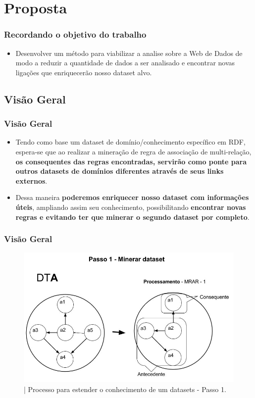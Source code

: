 \documentclass[hyperref={pdfpagelabels=false}]{beamer}
\begin{document}
    
\section{Proposta}

\begin{frame}
\frametitle{Recordando o objetivo do trabalho}
\begin{itemize}
 \item Desenvolver um método para viabilizar a analise sobre a Web de Dados de modo a reduzir a quantidade de dados a ser analisado e encontrar novas ligações que enriquecerão nosso dataset alvo. 
\end{itemize}		
\end{frame}


    

  \subsection{Visão Geral}  
	\begin{frame}
    \frametitle{Visão Geral}
   \begin{itemize}
      	\item Tendo como base um dataset de domínio/conhecimento específico em RDF, espera-se que ao realizar a mineração de regra de associação de multi-relação, \textbf{os consequentes das regras encontradas, servirão como ponte para outros datasets de domínios diferentes através de seus links externos}.
        \item Dessa maneira \textbf{poderemos enriquecer nosso dataset com informações úteis}, ampliando assim seu conhecimento, possibilitando \textbf{encontrar novas regras e evitando ter que minerar o segundo dataset por completo}. 
    \end{itemize}
   
   
	\end{frame}
    
	\begin{frame}
    \frametitle{Visão Geral}
    \begin{figure}[h]
	\centering
		\includegraphics[scale=0.3]{img/VisaoGeralProposta1}
	\caption{| Processo para estender o conhecimento de um datasets - Passo 1.}
	\label{fig:VisaoGeralProposta1}
\end{figure}
	\end{frame}
    
\end{document}
